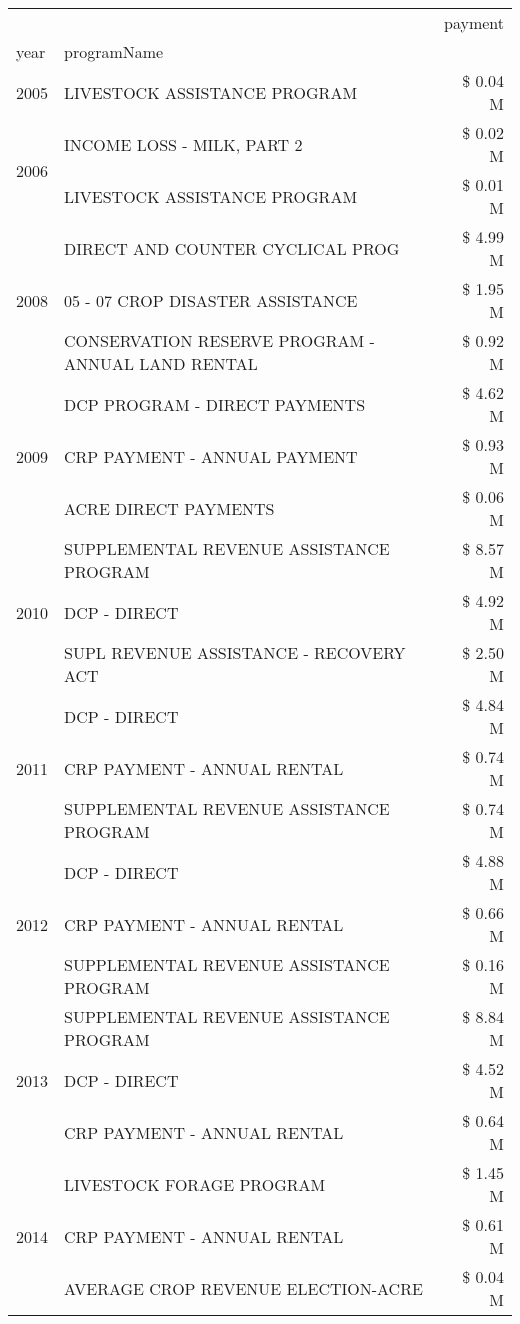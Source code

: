 \begin{tabular}{llr}
\toprule
 &  & payment \\
year & programName &  \\
\midrule
2005 & LIVESTOCK ASSISTANCE PROGRAM & \$ 0.04 M \\
\cline{1-3}
\multirow[t]{2}{*}{2006} & INCOME LOSS - MILK, PART 2 & \$ 0.02 M \\
 & LIVESTOCK ASSISTANCE PROGRAM & \$ 0.01 M \\
\cline{1-3}
\multirow[t]{3}{*}{2008} & DIRECT AND COUNTER CYCLICAL PROG & \$ 4.99 M \\
 & 05 - 07 CROP DISASTER ASSISTANCE & \$ 1.95 M \\
 & CONSERVATION RESERVE PROGRAM - ANNUAL LAND RENTAL & \$ 0.92 M \\
\cline{1-3}
\multirow[t]{3}{*}{2009} & DCP PROGRAM - DIRECT PAYMENTS & \$ 4.62 M \\
 & CRP PAYMENT - ANNUAL PAYMENT & \$ 0.93 M \\
 & ACRE DIRECT PAYMENTS & \$ 0.06 M \\
\cline{1-3}
\multirow[t]{3}{*}{2010} & SUPPLEMENTAL REVENUE ASSISTANCE PROGRAM & \$ 8.57 M \\
 & DCP - DIRECT & \$ 4.92 M \\
 & SUPL REVENUE ASSISTANCE - RECOVERY ACT & \$ 2.50 M \\
\cline{1-3}
\multirow[t]{3}{*}{2011} & DCP - DIRECT & \$ 4.84 M \\
 & CRP PAYMENT - ANNUAL RENTAL & \$ 0.74 M \\
 & SUPPLEMENTAL REVENUE ASSISTANCE PROGRAM & \$ 0.74 M \\
\cline{1-3}
\multirow[t]{3}{*}{2012} & DCP - DIRECT & \$ 4.88 M \\
 & CRP PAYMENT - ANNUAL RENTAL & \$ 0.66 M \\
 & SUPPLEMENTAL REVENUE ASSISTANCE PROGRAM & \$ 0.16 M \\
\cline{1-3}
\multirow[t]{3}{*}{2013} & SUPPLEMENTAL REVENUE ASSISTANCE PROGRAM & \$ 8.84 M \\
 & DCP - DIRECT & \$ 4.52 M \\
 & CRP PAYMENT - ANNUAL RENTAL & \$ 0.64 M \\
\cline{1-3}
\multirow[t]{3}{*}{2014} & LIVESTOCK FORAGE PROGRAM & \$ 1.45 M \\
 & CRP PAYMENT - ANNUAL RENTAL & \$ 0.61 M \\
 & AVERAGE CROP REVENUE ELECTION-ACRE & \$ 0.04 M \\
\cline{1-3}

\end{tabular}

